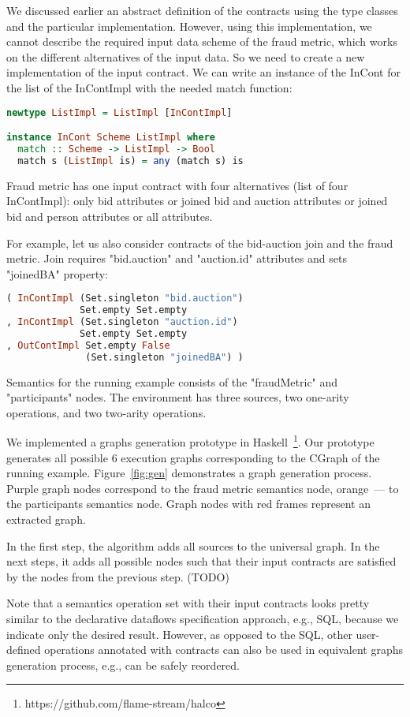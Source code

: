 We discussed earlier an abstract definition of the contracts using the type classes and the particular implementation. 
However, using this implementation, we cannot describe the required input data scheme of the fraud metric, which works on the different alternatives of the input data.
So we need to create a new implementation of the input contract.
We can write an instance of the InCont for the list of the InContImpl with the needed match function:

\begin{lstlisting}[language=Haskell]
newtype ListImpl = ListImpl [InContImpl]

instance InCont Scheme ListImpl where
  match :: Scheme -> ListImpl -> Bool
  match s (ListImpl is) = any (match s) is
\end{lstlisting}

Fraud metric has one input contract with four alternatives (list of four InContImpl):
only bid attributes
or joined bid and auction attributes
or joined bid and person attributes
or all attributes.

For example, let us also consider contracts of the bid-auction join and the fraud metric.
Join requires "bid.auction" and "auction.id" attributes and sets "joinedBA" property:
\begin{lstlisting}[language=Haskell]
( InContImpl (Set.singleton "bid.auction")
             Set.empty Set.empty
, InContImpl (Set.singleton "auction.id")
             Set.empty Set.empty
, OutContImpl Set.empty False
              (Set.singleton "joinedBA") )
\end{lstlisting}

Semantics for the running example consists of the "fraudMetric" and "participants" nodes.
The environment has three sources, two one-arity operations, and two two-arity operations.

We implemented a graphs generation prototype in Haskell~\footnote{https://github.com/flame-stream/halco}.
Our prototype generates all possible 6 execution graphs corresponding to the CGraph of the running example. Figure~\ref{fig:gen} demonstrates a graph generation process.
Purple graph nodes correspond to the fraud metric semantics node, orange~--- to the participants semantics node.
Graph nodes with red frames represent an extracted graph.

In the first step, the algorithm adds all sources to the universal graph.
In the next steps, it adds all possible nodes such that their input contracts are satisfied by the nodes from the previous step. (TODO)

Note that a semantics operation set with their input contracts looks pretty similar to the declarative dataflows specification approach, e.g., SQL, because we indicate only the desired result.
However, as opposed to the SQL, other user-defined operations annotated with contracts can also be used in equivalent graphs generation process, e.g., can be safely reordered.
